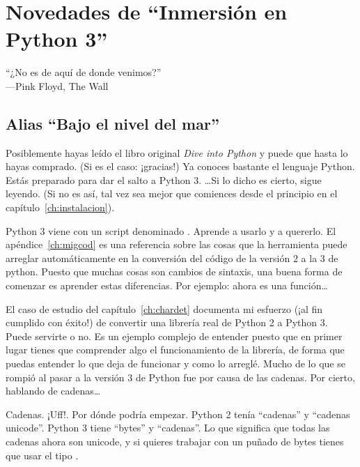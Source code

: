 
\chapter{Novedades de ``Inmersión en Python 3''}\label{ch:novedades}

\begin{citaCap}
``¿No es de aquí de donde venimos?''\\
---Pink Floyd, The Wall
\end{citaCap}

\section{Alias ``Bajo el nivel del mar''}

Posiblemente hayas leído el libro original \emph{Dive into Python} y puede que hasta lo hayas comprado. (Si es el caso: ¡gracias!) Ya conoces bastante el lenguaje Python. Estás preparado para dar el salto a Python 3. \ldots Si lo dicho es cierto, sigue leyendo. (Si no es así, tal vez sea mejor que comiences desde el principio en el capítulo~\ref{ch:instalacion}).

Python 3 viene con un script denominado . Aprende a usarlo y a quererlo. El apéndice~\ref{ch:migcod} es una referencia sobre las cosas que la herramienta  puede arreglar automáticamente en la conversión del código de la versión 2 a la 3 de python. Puesto que muchas cosas son cambios de sintaxis, una buena forma de comenzar es aprender estas diferencias. Por ejemplo:  ahora es una función\ldots

El caso de estudio del capítulo~\ref{ch:chardet} documenta mi esfuerzo (¡al fin cumplido con éxito!) de convertir una librería real de Python 2 a Python 3. Puede servirte o no. Es un ejemplo complejo de entender puesto que en primer lugar tienes que comprender algo el funcionamiento de la librería, de forma que puedas entender lo que deja de funcionar y como lo arreglé.  Mucho de lo que se rompió al pasar a la versión 3 de Python fue por causa de las cadenas.  Por cierto, hablando de cadenas\ldots

Cadenas. ¡Uff!. Por dónde podría empezar. Python 2 tenía ``cadenas'' y ``cadenas unicode''. Python 3 tiene ``bytes'' y ``cadenas''. Lo que significa que todas las cadenas ahora son unicode, y si quieres trabajar con un puñado de bytes tienes que usar el tipo .

